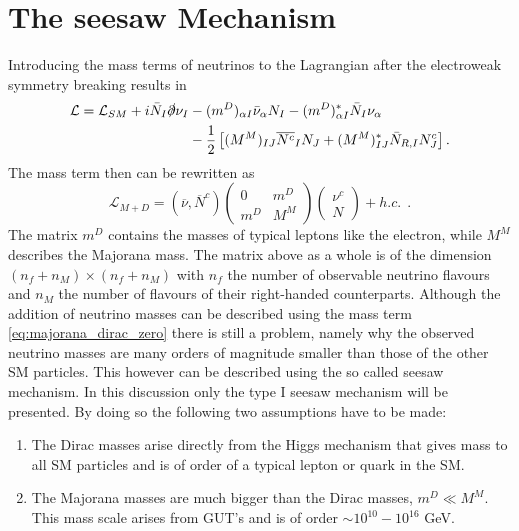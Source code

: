 \section{The seesaw Mechanism}
Introducing the mass terms of neutrinos to the Lagrangian after the electroweak symmetry breaking results in \cite[pp. 4f]{Drewes:2013gca}
\begin{align}
\mathcal{L}=\mathcal{L}_{SM}+i\bar{N}_{I}\slashed\partial\nu_{I}&-(m^D)_{\alpha I}\bar{\nu}_{\alpha}N_{I}-(m^D)_{\alpha I}^*\bar{N}_{I}\nu_{\alpha}
\label{eq:lagrangian_mass}
\\
&-\frac{1}{2}\left[(M^M)_{IJ}\overline{N^c}_{I}N_{J}+(M^M)^*_{IJ}\bar{N}_{R,I}N^c_{J}\right]\nonumber.
\end{align}
The mass term then can be rewritten as\cite[Eq. (12)]{Drewes:2013gca}
\begin{equation}
\mathcal{L}_{M+D}=\left(\overline{\nu},\overline{N}^c\right)	\left(\begin{array}{cc}0&m^D\\m^D&M^M\end{array}\right)	\left(\begin{array}{c}\nu^c\\N\end{array}\right)+h.c.\:\:.
\label{eq:majorana_dirac_zero}
\end{equation}
The matrix $m^D$ contains the masses of typical leptons like the electron, while $M^M$ describes the Majorana mass. The matrix above as a whole is of the dimension \newline $(n_f+n_M)\times(n_f+n_M)$ with $n_f$ the number of observable neutrino flavours and $n_M$ the number of flavours of their right-handed counterparts. \newline\indent
Although the addition of neutrino masses can be described using the mass term \eqref{eq:majorana_dirac_zero}
there is still a problem, namely why the observed neutrino masses are many orders of magnitude smaller than those of the other SM particles. This however can be described using the so called seesaw mechanism. In this discussion only the type I seesaw mechanism will be presented. By doing so the following two assumptions have to be made:
\begin{enumerate}
	\item The Dirac masses arise directly from the Higgs mechanism that gives mass to all SM particles and is of order of a typical lepton or quark in the SM.
	\item The Majorana masses are much bigger than the Dirac masses, $m^D\ll M^M$. This mass scale arises from GUT's and is of order $\sim10^{10}-10^{16}$ GeV.
\end{enumerate}
